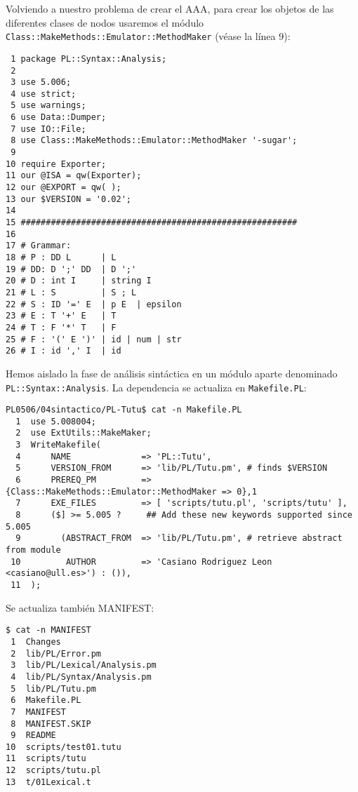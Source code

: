 Volviendo a nuestro problema de crear el AAA, para crear los 
objetos de las diferentes clases de nodos
usaremos el módulo  \verb|Class::MakeMethods::Emulator::MethodMaker|
(véase la línea 9):

\begin{verbatim}
 1 package PL::Syntax::Analysis;
 2
 3 use 5.006;
 4 use strict;
 5 use warnings;
 6 use Data::Dumper;
 7 use IO::File;
 8 use Class::MakeMethods::Emulator::MethodMaker '-sugar';
 9
10 require Exporter;
11 our @ISA = qw(Exporter);
12 our @EXPORT = qw( );
13 our $VERSION = '0.02';
14
15 #######################################################
16
17 # Grammar:
18 # P : DD L      | L
19 # DD: D ';' DD  | D ';'
20 # D : int I     | string I
21 # L : S         | S ; L
22 # S : ID '=' E  | p E  | epsilon
23 # E : T '+' E   | T
24 # T : F '*' T   | F
25 # F : '(' E ')' | id | num | str
26 # I : id ',' I  | id
\end{verbatim}

Hemos aislado la fase de análisis sintáctica en un módulo
aparte denominado \verb|PL::Syntax::Analysis|.
La dependencia se actualiza en \verb|Makefile.PL|:
\begin{verbatim}
PL0506/04sintactico/PL-Tutu$ cat -n Makefile.PL
  1  use 5.008004;
  2  use ExtUtils::MakeMaker;
  3  WriteMakefile(
  4      NAME              => 'PL::Tutu',
  5      VERSION_FROM      => 'lib/PL/Tutu.pm', # finds $VERSION
  6      PREREQ_PM         => {Class::MakeMethods::Emulator::MethodMaker => 0},1
  7      EXE_FILES         => [ 'scripts/tutu.pl', 'scripts/tutu' ],
  8      ($] >= 5.005 ?     ## Add these new keywords supported since 5.005
  9        (ABSTRACT_FROM  => 'lib/PL/Tutu.pm', # retrieve abstract from module
 10         AUTHOR         => 'Casiano Rodriguez Leon <casiano@ull.es>') : ()),
 11  );
\end{verbatim}
Se actualiza también MANIFEST:
\begin{verbatim}
$ cat -n MANIFEST
 1  Changes
 2  lib/PL/Error.pm
 3  lib/PL/Lexical/Analysis.pm
 4  lib/PL/Syntax/Analysis.pm
 5  lib/PL/Tutu.pm
 6  Makefile.PL
 7  MANIFEST
 8  MANIFEST.SKIP
 9  README
10  scripts/test01.tutu
11  scripts/tutu
12  scripts/tutu.pl
13  t/01Lexical.t
\end{verbatim}


